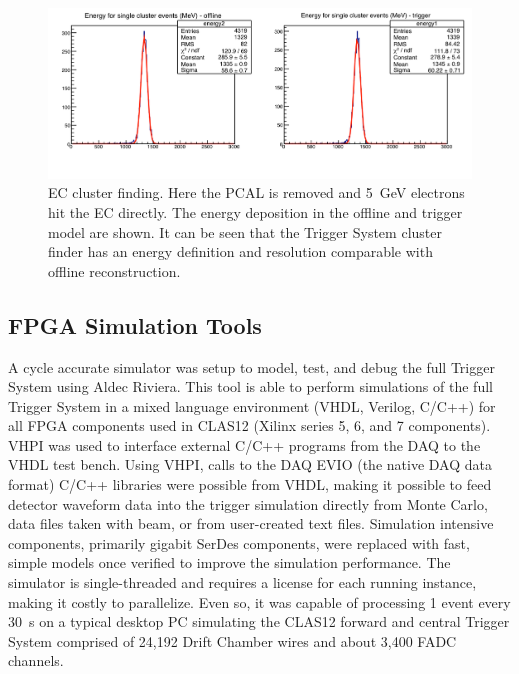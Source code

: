 \begin{figure}[htp]
	\begin{center}
		\centering
		\includegraphics[width=\columnwidth]{img/ecal_sim3.png}
		\caption{EC cluster finding. Here the PCAL is removed and 5~GeV electrons hit the EC directly. The
                  energy deposition in the offline and trigger model are shown. It can be seen that the Trigger System
                  cluster finder has an energy definition and resolution comparable with offline reconstruction.}
		\label{fig:ecal_sim3}
	\end{center}
\end{figure} 

\subsection{FPGA Simulation Tools}

A cycle accurate simulator was setup to model, test, and debug the full Trigger System using Aldec Riviera. This
tool is able to perform simulations of the full Trigger System in a mixed language environment (VHDL, Verilog,
C/C++) for all FPGA components used in CLAS12 (Xilinx series 5, 6, and 7 components). VHPI was used to
interface external C/C++ programs from the DAQ to the VHDL test bench. Using VHPI, calls to the DAQ EVIO
(the native DAQ data format) C/C++ libraries were possible from VHDL, making it possible to feed detector
waveform data into the trigger simulation directly from Monte Carlo, data files taken with beam, or from
user-created text files. Simulation intensive components, primarily gigabit SerDes components, were replaced
with fast, simple models once verified to improve the simulation performance. The simulator is single-threaded
and requires a license for each running instance, making it costly to parallelize. Even so, it was capable of
processing 1 event every 30~s on a typical desktop PC simulating the CLAS12 forward and central Trigger
System comprised of 24,192 Drift Chamber wires and about 3,400 FADC channels.

